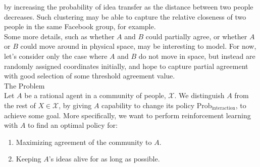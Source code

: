 \documentclass{article}
\begin{document}
\begin{flushleft}
by increasing the probability of idea transfer as the distance between two people decreases. Such clustering may be able to capture the relative closeness of two people in the same Facebook group, for example.\\
\vspace{5pt}
Some more details, such as whether $A$ and $B$ could partially agree, or whether $A$ or $B$ could move around in physical space, may be interesting to model. For now, let's consider only the case where $A$ and $B$ do not move in space, but instead are randomly assigned coordinates initially, and hope to capture partial agreement with good selection of some threshold agreement value.\\
\vspace{10pt}
The Problem\\
\vspace{3pt}
Let $A$ be a rational agent in a community of people, $\mathcal{X}$. We distinguish $A$ from the rest of $X \in \mathcal{X}$, by giving $A$ capability to change its policy $\textrm{Prob}_{\textrm{interaction}}$, to achieve some goal. More specifically, we want to perform reinforcement learning with $A$ to find an optimal policy for:
\begin{enumerate}
\item Maximizing agreement of the community to $A$.
\item Keeping $A$'s ideas alive for as long as possible.
\end{enumerate}


\end{flushleft}
\end{document}
